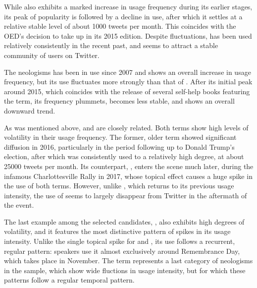 \documentclass[
  a4paper,
  abstract=on,
  captions=tableabove
  ]{scrartcl}
\begin{document}
         While  also exhibits a marked increase in usage frequency during its earlier stages, its peak of popularity is followed by a decline in use, after which it settles at a relative stable level of about \num{1000} tweets per month. This coincides with the OED's decision to take up  in its 2015 edition. Despite fluctuations,  has been used relatively consistently in the recent past, and seems to attract a stable community of users on Twitter.

         The neologisms  has been in use since 2007 and shows an overall increase in usage frequency, but its use fluctuates more strongly than that of . After its initial peak around 2015, which coincides with the release of several self-help books featuring the term, its frequency plummets, becomes less stable, and shows an overall downward trend.

         As was mentioned above,  and  are closely related. Both terms show high levels of volatility in their usage frequency. The former, older term showed significant diffusion in 2016, particularly in the period following up to Donald Trump's election, after which  was consistently used to a relatively high degree, at about \num{25000} tweets per month. Its counterpart, , enters the scene much later, during the infamous Charlottesville Rally in 2017, whose topical effect causes a huge spike in the use of both terms. However, unlike , which returns to its previous usage intensity, the use of  seems to largely disappear from Twitter in the aftermath of the event.

         The last example among the selected candidates, , also exhibits high degrees of volatility, and it features the most distinctive pattern of spikes in its usage intensity. Unlike the single topical spike for  and , its use follows a recurrent, regular pattern: speakers use it almost exclusively around Remembrance Day, which takes place in November. The term  represents a last category of neologisms in the sample, which show wide fluctions in usage intensity, but for which these patterns follow a regular temporal pattern. 
\end{document}
